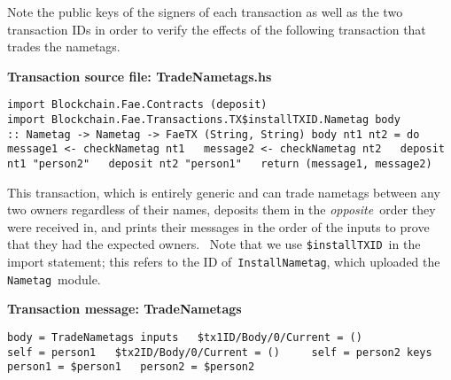 \documentclass[11pt]{article}
\newcommand{\codeblock}[1]{\begin{mdframed}[
    backgroundcolor=header-color,
    linecolor=header-color,
    innertopmargin=10pt,
    ]{\texttt{#1}}\end{mdframed}}
\begin{document}
Note the public keys of the signers of each transaction as well as the two transaction IDs in order to verify the effects of the following transaction that trades the nametags.


\vspace{11pt}

\textbf{Transaction source file: TradeNametags.hs}

\codeblock{import Blockchain.Fae.Contracts (deposit)\newline
import Blockchain.Fae.Transactions.TX\$installTXID.Nametag\newline
\newline
body :: Nametag -\textgreater{} Nametag -\textgreater{} FaeTX (String, String)\newline
body nt1 nt2 = do\newline
  message1 \textless{}- checkNametag nt1\newline
  message2 \textless{}- checkNametag nt2\newline
  deposit nt1 "person2"\newline
  deposit nt2 "person1"\newline
  return (message1, message2)}

This transaction, which is entirely generic and can trade nametags between any two owners regardless of their names, deposits them in the \textit{opposite} order they were received in, and prints their messages in the order of the inputs to prove that they had the expected owners.  Note that we use \texttt{\$installTXID} in the import statement; this refers to the ID of \texttt{InstallNametag}, which uploaded the \texttt{Nametag} module.


\vspace{11pt}

\textbf{Transaction message: TradeNametags}

\codeblock{body = TradeNametags\newline
inputs\newline
  \$tx1ID\slash{}Body\slash{}0\slash{}Current = ()\newline
    self = person1\newline
  \$tx2ID\slash{}Body\slash{}0\slash{}Current = ()\newline
    self = person2\newline
keys\newline
  person1 = \$person1\newline
  person2 = \$person2}
\end{document}

